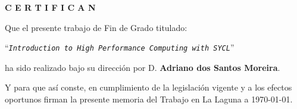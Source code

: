 \documentclass[english,a4paper,12pt,oneside]{extreport}
\newcommand{\TitleTopic}{\texttt{Introduction to High Performance Computing with SYCL}}
\begin{document}
\bigskip

\bigskip
\bigskip
{\bf C E R T I F I C A N}

\bigskip
\bigskip
\bigskip
Que el presente trabajo de Fin de Grado titulado:

\bigskip
``{\it \TitleTopic{}}''

\bigskip
\bigskip
\bigskip
\noindent ha sido realizado bajo su dirección por D. {\bf Adriano dos Santos Moreira}.

\bigskip
\bigskip

Y para que así conste, en cumplimiento de la legislación vigente y a los efectos
oportunos firman la presente memoria del Trabajo en La Laguna a {\today}.

\newpage
\thispagestyle{empty}
\end{document}

